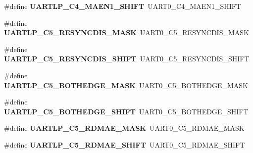 \begin{DoxyCompactItemize}
\item 
\hypertarget{group___backward___compatibility___symbols_ga0c83ed1dac8e50a43d52747f42b80a3d}{}\#define {\bfseries U\+A\+R\+T\+L\+P\+\_\+\+C4\+\_\+\+M\+A\+E\+N1\+\_\+\+S\+H\+I\+F\+T}~U\+A\+R\+T0\+\_\+\+C4\+\_\+\+M\+A\+E\+N1\+\_\+\+S\+H\+I\+F\+T\label{group___backward___compatibility___symbols_ga0c83ed1dac8e50a43d52747f42b80a3d}

\item 
\hypertarget{group___backward___compatibility___symbols_ga6c8f73a689a6c4d5d7425325b8c3bde2}{}\#define {\bfseries U\+A\+R\+T\+L\+P\+\_\+\+C5\+\_\+\+R\+E\+S\+Y\+N\+C\+D\+I\+S\+\_\+\+M\+A\+S\+K}~U\+A\+R\+T0\+\_\+\+C5\+\_\+\+R\+E\+S\+Y\+N\+C\+D\+I\+S\+\_\+\+M\+A\+S\+K\label{group___backward___compatibility___symbols_ga6c8f73a689a6c4d5d7425325b8c3bde2}

\item 
\hypertarget{group___backward___compatibility___symbols_gaff26147c2d7f8a45ddaa3d4ecb42343d}{}\#define {\bfseries U\+A\+R\+T\+L\+P\+\_\+\+C5\+\_\+\+R\+E\+S\+Y\+N\+C\+D\+I\+S\+\_\+\+S\+H\+I\+F\+T}~U\+A\+R\+T0\+\_\+\+C5\+\_\+\+R\+E\+S\+Y\+N\+C\+D\+I\+S\+\_\+\+S\+H\+I\+F\+T\label{group___backward___compatibility___symbols_gaff26147c2d7f8a45ddaa3d4ecb42343d}

\item 
\hypertarget{group___backward___compatibility___symbols_ga6b248448b3fc7bf345c7a75bec3b8aa3}{}\#define {\bfseries U\+A\+R\+T\+L\+P\+\_\+\+C5\+\_\+\+B\+O\+T\+H\+E\+D\+G\+E\+\_\+\+M\+A\+S\+K}~U\+A\+R\+T0\+\_\+\+C5\+\_\+\+B\+O\+T\+H\+E\+D\+G\+E\+\_\+\+M\+A\+S\+K\label{group___backward___compatibility___symbols_ga6b248448b3fc7bf345c7a75bec3b8aa3}

\item 
\hypertarget{group___backward___compatibility___symbols_gac6b4dfae8e6dc532807323db5e2e489c}{}\#define {\bfseries U\+A\+R\+T\+L\+P\+\_\+\+C5\+\_\+\+B\+O\+T\+H\+E\+D\+G\+E\+\_\+\+S\+H\+I\+F\+T}~U\+A\+R\+T0\+\_\+\+C5\+\_\+\+B\+O\+T\+H\+E\+D\+G\+E\+\_\+\+S\+H\+I\+F\+T\label{group___backward___compatibility___symbols_gac6b4dfae8e6dc532807323db5e2e489c}

\item 
\hypertarget{group___backward___compatibility___symbols_ga8b81dfd26f766f55a3c80110e5439652}{}\#define {\bfseries U\+A\+R\+T\+L\+P\+\_\+\+C5\+\_\+\+R\+D\+M\+A\+E\+\_\+\+M\+A\+S\+K}~U\+A\+R\+T0\+\_\+\+C5\+\_\+\+R\+D\+M\+A\+E\+\_\+\+M\+A\+S\+K\label{group___backward___compatibility___symbols_ga8b81dfd26f766f55a3c80110e5439652}

\item 
\hypertarget{group___backward___compatibility___symbols_gabf5bb3ff2b944bfdbfd8b05f29c7b678}{}\#define {\bfseries U\+A\+R\+T\+L\+P\+\_\+\+C5\+\_\+\+R\+D\+M\+A\+E\+\_\+\+S\+H\+I\+F\+T}~U\+A\+R\+T0\+\_\+\+C5\+\_\+\+R\+D\+M\+A\+E\+\_\+\+S\+H\+I\+F\+T\label{group___backward___compatibility___symbols_gabf5bb3ff2b944bfdbfd8b05f29c7b678}


\end{DoxyCompactItemize}
